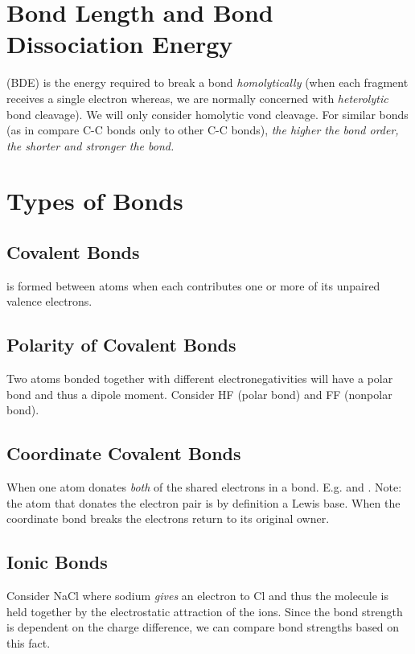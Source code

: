\documentclass[../GChemReview.tex]{subfiles}
\begin{document}
  \section{Bond Length and Bond Dissociation Energy}

   (BDE) is the energy required to break a bond
  \emph{homolytically} (when each fragment receives a single electron whereas,
  we are normally concerned with \emph{heterolytic} bond cleavage). We will only
  consider homolytic vond cleavage. For similar bonds (as in compare C-C bonds
  only to other C-C bonds), \emph{the higher the bond order, the shorter and
  stronger the bond.}

  \section{Types of Bonds}

  \subsection{Covalent Bonds}

   is formed between atoms when each contributes one or
  more of its unpaired valence electrons. 

  \subsection{Polarity of Covalent Bonds}

  Two atoms bonded together with different electronegativities will have a polar
  bond and thus a dipole moment. Consider HF (polar bond) and FF (nonpolar
  bond).

  \subsection{Coordinate Covalent Bonds}

  When one atom donates \emph{both} of the shared electrons in a bond. E.g.
   and . Note: the atom that donates the
  electron pair is by definition a Lewis base. When the coordinate bond breaks
  the electrons return to its original owner.

  \subsection{Ionic Bonds}

  Consider NaCl where sodium \emph{gives} an electron to Cl and thus the
  molecule is held together by the electrostatic attraction of the ions. Since
  the bond strength is dependent on the charge difference, we can compare bond
  strengths based on this fact.
\end{document}
